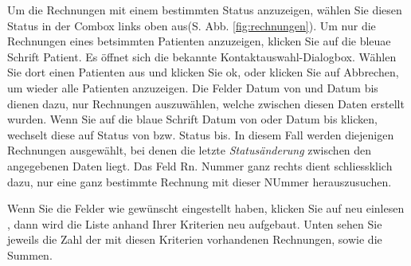 Um die Rechnungen mit einem bestimmten Status anzuzeigen, wählen Sie diesen Status in der Combox links oben aus(S. Abb. \ref{fig:rechnungen}).
Um nur die Rechnungen eines betsimmten Patienten anzuzeigen, klicken Sie auf die bleuae Schrift \glqq Patient\grqq{}. Es öffnet sich die bekannte Kontaktauswahl-Dialogbox. Wählen Sie dort einen Patienten aus und klicken Sie ok, oder klicken Sie auf Abbrechen, um wieder alle Patienten anzuzeigen. Die Felder \glqq Datum von\grqq{} und \glqq Datum bis\grqq{} dienen dazu, nur Rechnungen auszuwählen, welche zwischen diesen Daten erstellt wurden. Wenn Sie auf die blaue Schrift Datum von oder Datum bis klicken, wechselt diese auf \glqq Status von\grqq{} bzw. \glqq Status bis\grqq{}. In diesem Fall werden diejenigen Rechnungen ausgewählt, bei denen die letzte \textit{Statusänderung} zwischen den angegebenen Daten liegt.
Das Feld \glqq Rn. Nummer\grqq{} ganz rechts dient schliessklich dazu, nur eine ganz bestimmte Rechnung mit dieser NUmmer herauszusuchen.

Wenn Sie die Felder wie gewünscht eingestellt haben, klicken Sie auf \glqq neu einlesen \grqq{}, dann wird die Liste anhand Ihrer Kriterien neu aufgebaut.
Unten sehen Sie jeweils die Zahl der mit diesen Kriterien vorhandenen Rechnungen, sowie die Summen.
